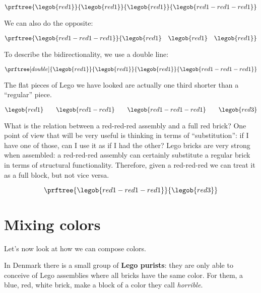 \begin{equation}
\prftree{\legob{red1}}{\legob{red1}}{\legob{red1}}{\legob{red1-red1-red1}}
\end{equation}

We can also do the opposite:

\begin{equation}
\prftree{\legob{red1-red1-red1}}{\legob{red1}\quad\legob{red1}\quad\legob{red1}}
\end{equation}

To describe the bidirectionality, we use a double line:

\begin{equation}
\prftree[double]{\legob{red1}}{\legob{red1}}{\legob{red1}}{\legob{red1-red1-red1}}
\end{equation}

The flat pieces of Lego we have looked are actually one third shorter than a ``regular'' piece.

\begin{equation}
  \legob{red1} \qquad \legob{red1-red1}  \qquad \legob{red1-red1-red1} \qquad \legob{red3}
\end{equation}

What is the relation between a red-red-red assembly and a full red brick?
One point of view that will be very useful is thinking in terms of ``substitution'': if I have one of those, can I use it as if I had the other?
Lego bricks are very strong when assembled: a red-red-red assembly can certainly substitute
a regular brick in terms of structural functionality.
Therefore, given a red-red-red we can treat it as a full block, but not vice versa.

\begin{equation}
\prftree{\legob{red1-red1-red1}}{\legob{red3}}
\end{equation}


\section{Mixing colors}

Let's now look at how we can compose colors.


In Denmark there is a small group of \textbf{Lego purists}: they are only able to conceive of Lego assemblies where all bricks have the same color.
For them, a blue, red, white brick, make a block of a color they call \emph{horrible}.

